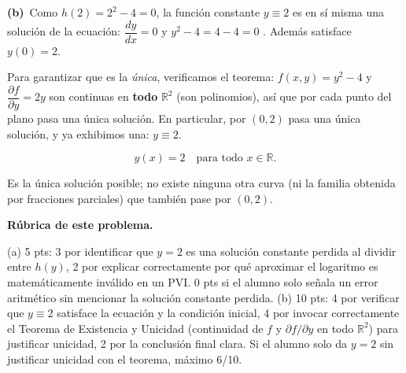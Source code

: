 \documentclass[11pt,letterpaper]{article}
\newcommand{\subparte}[2]{%
  \medskip\noindent\textbf{(#1}\ #2\par\smallskip
}
\newenvironment{resultado}
  {\begin{mdframed}[linecolor=black,linewidth=0.6pt,
    innerleftmargin=6pt,innerrightmargin=6pt,innertopmargin=4pt,innerbottommargin=4pt]
   \bfseries}
  {\end{mdframed}}
\newenvironment{rubrica}{%
  \begin{mdframed}[linecolor=black,linewidth=0.6pt,
    innerleftmargin=8pt,innerrightmargin=8pt,innertopmargin=5pt,innerbottommargin=5pt]
  \small\textbf{Rúbrica de este problema.}\par\smallskip
}{\end{mdframed}}
\begin{document}
\subparte{b)}{Como $h(2)=2^2-4=0$, la función constante $y\equiv 2$ es en sí misma una solución de la ecuación: $\dfrac{dy}{dx}=0$ y $y^2-4=4-4=0$ \checkmark. Además satisface $y(0)=2$.

Para garantizar que es la \emph{única}, verificamos el teorema: $f(x,y)=y^2-4$ y $\dfrac{\partial f}{\partial y}=2y$ son continuas en \textbf{todo} $\mathbb{R}^2$ (son polinomios), así que por cada punto del plano pasa una única solución. En particular, por $(0,2)$ pasa una única solución, y ya exhibimos una: $y\equiv2$.
\begin{resultado}
\[
y(x) = 2 \quad \text{para todo } x \in \mathbb{R}.
\]
\end{resultado}
Es la única solución posible; no existe ninguna otra curva (ni la familia obtenida por fracciones parciales) que también pase por $(0,2)$.}

\begin{rubrica}
(a) 5 pts: 3 por identificar que $y=2$ es una solución constante perdida al dividir entre $h(y)$, 2 por explicar correctamente por qué aproximar el logaritmo es matemáticamente inválido en un PVI. 0 pts si el alumno solo señala un error aritmético sin mencionar la solución constante perdida. (b) 10 pts: 4 por verificar que $y\equiv2$ satisface la ecuación y la condición inicial, 4 por invocar correctamente el Teorema de Existencia y Unicidad (continuidad de $f$ y $\partial f/\partial y$ en todo $\mathbb{R}^2$) para justificar unicidad, 2 por la conclusión final clara. Si el alumno solo da $y=2$ sin justificar unicidad con el teorema, máximo 6/10.
\end{rubrica}
\end{document}
